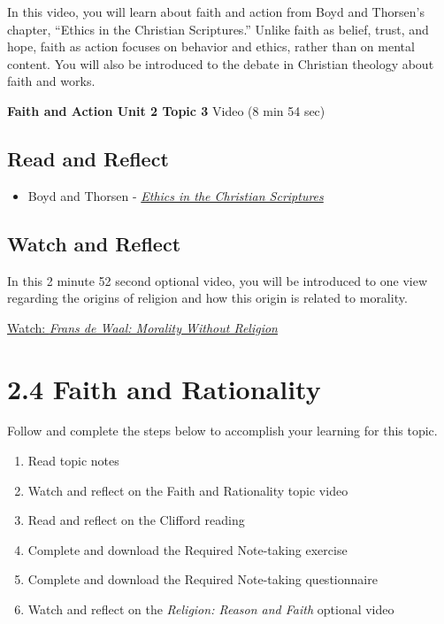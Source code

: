 \documentclass[
]{book}
\providecommand{\tightlist}{%
  \setlength{\itemsep}{0pt}\setlength{\parskip}{0pt}}
\begin{document}
In this video, you will learn about faith and action from Boyd and Thorsen's chapter, ``Ethics in the Christian Scriptures.'' Unlike faith as belief, trust, and hope, faith as action focuses on behavior and ethics, rather than on mental content. You will also be introduced to the debate in Christian theology about faith and works.

\textbf{Faith and Action Unit 2 Topic 3} Video (8 min 54 sec)

\hypertarget{read-and-reflect-5}{%
\subsection*{Read and Reflect}\label{read-and-reflect-5}}

\begin{itemize}
\tightlist
\item
  Boyd and Thorsen - \href{assets/u2/PHIL-100-Boyd-and-Thorsen-Ethics-in-the-Christian-Scriptures.pdf}{\emph{Ethics in the Christian Scriptures}}
\end{itemize}

\hypertarget{watch-and-reflect-14}{%
\subsection*{Watch and Reflect}\label{watch-and-reflect-14}}

\begin{reflect}
In this 2 minute 52 second optional video, you will be introduced to one view regarding the origins of religion and how this origin is related to morality.

\href{https://www.youtube.com/watch?v=sEQuIDqY6Cc}{Watch: \emph{Frans de Waal: Morality Without Religion}}
\end{reflect}

\hypertarget{faith-and-rationality}{%
\section*{2.4 Faith and Rationality}\label{faith-and-rationality}}

Follow and complete the steps below to accomplish your learning for this topic.

\begin{enumerate}
\def\labelenumi{\arabic{enumi}.}
\tightlist
\item
  Read topic notes
\item
  Watch and reflect on the Faith and Rationality topic video
\item
  Read and reflect on the Clifford reading
\item
  Complete and download the Required Note-taking exercise
\item
  Complete and download the Required Note-taking questionnaire
\item
  Watch and reflect on the \emph{Religion: Reason and Faith} optional video
\end{enumerate}
\end{document}
